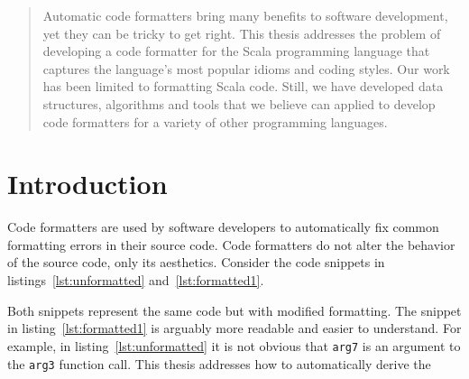 \documentclass[11pt,a4paper]{article}
\begin{document}






\begin{abstract}
  Automatic code formatters bring many benefits to software development, yet they can be tricky to get right.
  This thesis addresses the problem of developing a code formatter for the
  Scala programming language that captures the language's most popular idioms
  and coding styles.
  Our work has been limited to formatting Scala code.
  Still, we have developed data structures, algorithms and tools that we
  believe can applied to develop code formatters for a variety of other
  programming languages.
\end{abstract}
\tableofcontents
% 
\pagebreak
\section{Introduction} %
\label{sec:Introduction}
\lstset{style=scala}

Code formatters are used by software developers to automatically fix common formatting errors in their source code.
Code formatters do not alter the behavior of the source code, only its aesthetics.
Consider the code snippets in listings~\ref{lst:unformatted} and~\ref{lst:formatted1}.

\noindent
\begin{minipage}{.45\textwidth}

\end{minipage}
\hfil
\begin{minipage}{.45\textwidth}

\end{minipage}
Both snippets represent the same code but with modified formatting.
The snippet in listing~\ref{lst:formatted1} is arguably more readable and easier to understand.
For example, in listing~\ref{lst:unformatted} it is not obvious that \texttt{arg7} is an argument to the \texttt{arg3} function call.
This thesis addresses how to automatically derive the 
\end{document}
